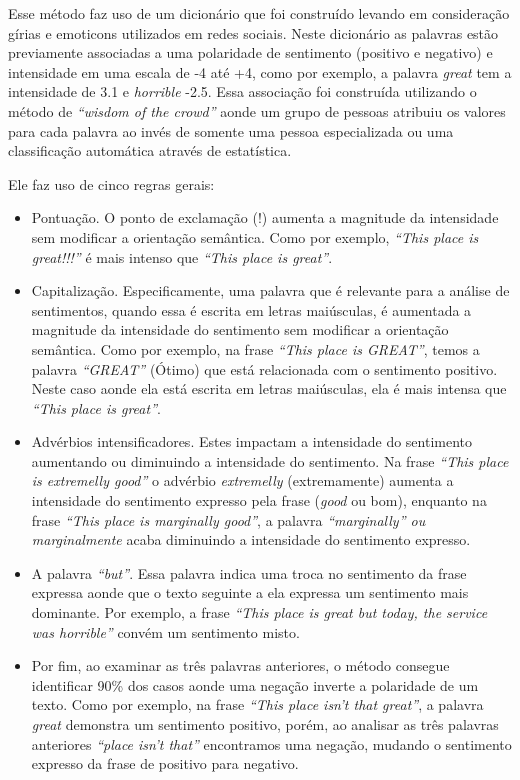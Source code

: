 Esse método faz uso de um dicionário que foi construído levando em consideração
gírias e emoticons utilizados em redes sociais. Neste dicionário as palavras
estão previamente associadas a uma polaridade de sentimento (positivo e
negativo) e intensidade em uma escala de -4 até +4, como por exemplo, a palavra
\textit{great} tem a intensidade de 3.1 e \textit{horrible} -2.5. Essa
associação foi construída utilizando o método de \textit{``wisdom of the
crowd''} aonde um grupo de pessoas atribuiu os valores para cada palavra ao
invés de somente uma pessoa especializada ou uma classificação automática
através de estatística.

Ele faz uso de cinco regras gerais:


\begin{itemize}
  \item Pontuação. O ponto de exclamação (!) aumenta a magnitude da
  intensidade sem modificar a orientação semântica. Como por exemplo,
  \textit{``This place is great!!!''} é mais intenso que \textit{``This place
  is great''}.
  \item Capitalização. Especificamente, uma palavra que é relevante para a
  análise de sentimentos, quando essa é escrita em letras maiúsculas, é
  aumentada a magnitude da intensidade do sentimento sem modificar a orientação
  semântica. Como por exemplo, na frase \textit{``This place is GREAT''}, temos
  a palavra \textit{``GREAT''} (Ótimo) que está relacionada com o sentimento
  positivo. Neste caso aonde ela está escrita em letras maiúsculas, ela é mais
  intensa que \textit{``This place is great''}.
  \item Advérbios intensificadores. Estes impactam a intensidade do sentimento
  aumentando ou diminuindo a intensidade do sentimento. Na frase \textit{``This
  place is extremelly good''} o advérbio \textit{extremelly} (extremamente)
  aumenta a intensidade do sentimento expresso pela frase (\textit{good} ou
  bom), enquanto na frase \textit{``This place is marginally good''}, a palavra
  \textit{``marginally'' ou marginalmente} acaba diminuindo a intensidade do
  sentimento expresso.
  \item A palavra \textit{``but''}. Essa palavra indica uma troca no sentimento
  da frase expressa aonde que o texto seguinte a ela expressa um sentimento mais
  dominante. Por exemplo, a frase \textit{``This place is great but today, the
  service was horrible''} convém um sentimento misto.
  \item Por fim, ao examinar as três palavras anteriores, o método consegue
  identificar 90\% dos casos aonde uma negação inverte a polaridade de um texto.
  Como por exemplo, na frase \textit{``This place isn't that great''}, a
  palavra \textit{great} demonstra um sentimento positivo, porém, ao analisar
  as três palavras anteriores \textit{``place isn't that''} encontramos uma
  negação, mudando o sentimento expresso da frase de positivo para negativo.
\end{itemize}

